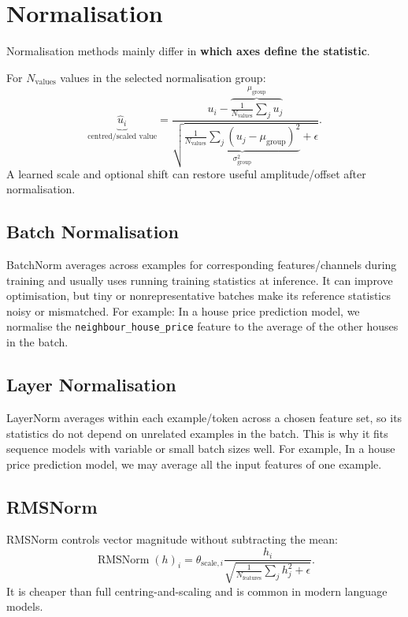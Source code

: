 \section{Normalisation}
\label{sec:normalisation}
Normalisation methods mainly differ in \textbf{which axes define the statistic}.

For $N_{\text{values}}$ values in the selected normalisation group:
\[
    \underbrace{\hat u_i}_{\text{centred/scaled value}}
    =
    \frac{
     u_i-\overbrace{\frac{1}{N_{\text{values}}}\sum_j u_j}^{\mu_{\text{group}}}
    }{
    \sqrt{
    \underbrace{\frac{1}{N_{\text{values}}}\sum_j(u_j-\mu_{\text{group}})^2}_{\sigma^2_{\text{group}}}
    +\epsilon
    }}.
\]
A learned scale and optional shift can restore useful amplitude/offset after normalisation.

\subsection{Batch Normalisation}
\label{subsec:stability-batch-normalisation}
BatchNorm averages across examples for corresponding features/channels during training and usually uses running training statistics at inference.
It can improve optimisation, but tiny or nonrepresentative batches make its reference statistics noisy or mismatched.
For example: In a house price prediction model, we normalise the \texttt{neighbour\_house\_price} feature to the average of the other houses in the batch.

\subsection{Layer Normalisation}
\label{subsec:stability-layer-normalisation}
LayerNorm averages within each example/token across a chosen feature set, so its statistics do not depend on unrelated examples in the batch.
This is why it fits sequence models with variable or small batch sizes well.
For example, In a house price prediction model, we may average all the input features of one example.

\subsection{RMSNorm}
\label{subsec:stability-rmsnorm}
RMSNorm controls vector magnitude without subtracting the mean:
\[
    \operatorname{RMSNorm}(h)_i
    =
    \theta_{\text{scale},i}
    \frac{h_i}{
    \sqrt{\frac{1}{N_{\text{features}}}\sum_j h_j^2+\epsilon}}
    .
\]
It is cheaper than full centring-and-scaling and is common in modern language models.

